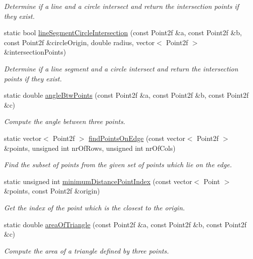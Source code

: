 \begin{DoxyCompactItemize}
\begin{DoxyCompactList}\small\item\em \-Determine if a line and a circle intersect and return the intersection points if they exist. \end{DoxyCompactList}\item 
static bool \hyperlink{classmultiscale_1_1Geometry2D_a92bd36cdda4cdacb4101c6db54474a6d}{line\-Segment\-Circle\-Intersection} (const \-Point2f \&a, const \-Point2f \&b, const \-Point2f \&circle\-Origin, double radius, vector$<$ \-Point2f $>$ \&intersection\-Points)
\begin{DoxyCompactList}\small\item\em \-Determine if a line segment and a circle intersect and return the intersection points if they exist. \end{DoxyCompactList}\item 
static double \hyperlink{classmultiscale_1_1Geometry2D_ace72cd1329667fdb5bc3fc40b96694bd}{angle\-Btw\-Points} (const \-Point2f \&a, const \-Point2f \&b, const \-Point2f \&c)
\begin{DoxyCompactList}\small\item\em \-Compute the angle between three points. \end{DoxyCompactList}\item 
static vector$<$ \-Point2f $>$ \hyperlink{classmultiscale_1_1Geometry2D_a9e5c6378463c0e685136d66bfac2a8c1}{find\-Points\-On\-Edge} (const vector$<$ \-Point2f $>$ \&points, unsigned int nr\-Of\-Rows, unsigned int nr\-Of\-Cols)
\begin{DoxyCompactList}\small\item\em \-Find the subset of points from the given set of points which lie on the edge. \end{DoxyCompactList}\item 
static unsigned int \hyperlink{classmultiscale_1_1Geometry2D_ae8e5e46c312835e27478ce00b11f8a7c}{minimum\-Distance\-Point\-Index} (const vector$<$ \-Point $>$ \&points, const \-Point2f \&origin)
\begin{DoxyCompactList}\small\item\em \-Get the index of the point which is the closest to the origin. \end{DoxyCompactList}\item 
static double \hyperlink{classmultiscale_1_1Geometry2D_abf0e96a63cf744cab74ab94398e28562}{area\-Of\-Triangle} (const \-Point2f \&a, const \-Point2f \&b, const \-Point2f \&c)
\begin{DoxyCompactList}\small\item\em \-Compute the area of a triangle defined by three points. \end{DoxyCompactList}\item 

\end{DoxyCompactItemize}
